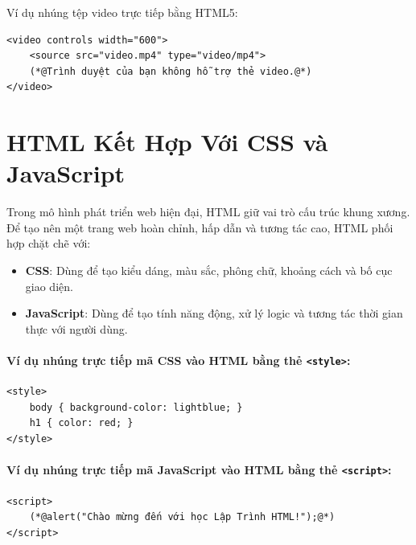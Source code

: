\documentclass[11pt,oneside]{book}
\newcommand{\codeinline}[1]{\textcolor{accentOrange}{\texttt{#1}}}
\begin{document}
Ví dụ nhúng tệp video trực tiếp bằng HTML5:
\begin{codeWindow}
\begin{lstlisting}[language=HTML5]
<video controls width="600">
    <source src="video.mp4" type="video/mp4">
    (*@Trình duyệt của bạn không hỗ trợ thẻ video.@*)
</video>
\end{lstlisting}
\end{codeWindow}

\section{HTML Kết Hợp Với CSS và JavaScript}
\label{sec:html_css_js_integration}

Trong mô hình phát triển web hiện đại, HTML giữ vai trò cấu trúc khung xương. Để tạo nên một trang web hoàn chỉnh, hấp dẫn và tương tác cao, HTML phối hợp chặt chẽ với:
\begin{itemize}[leftmargin=1.8em, itemsep=2pt, parsep=0pt]
    \item \textbf{CSS}: Dùng để tạo kiểu dáng, màu sắc, phông chữ, khoảng cách và bố cục giao diện.
    \item \textbf{JavaScript}: Dùng để tạo tính năng động, xử lý logic và tương tác thời gian thực với người dùng.
\end{itemize}

\paragraph{Ví dụ nhúng trực tiếp mã CSS vào HTML bằng thẻ \codeinline{<style>}:}
\begin{codeWindow}
\begin{lstlisting}[language=HTML5]
<style>
    body { background-color: lightblue; }
    h1 { color: red; }
</style>
\end{lstlisting}
\end{codeWindow}

\paragraph{Ví dụ nhúng trực tiếp mã JavaScript vào HTML bằng thẻ \codeinline{<script>}:}
\begin{codeWindow}
\begin{lstlisting}[language=HTML5]
<script>
    (*@alert("Chào mừng đến với học Lập Trình HTML!");@*)
</script>
\end{lstlisting}
\end{codeWindow}
\end{document}
